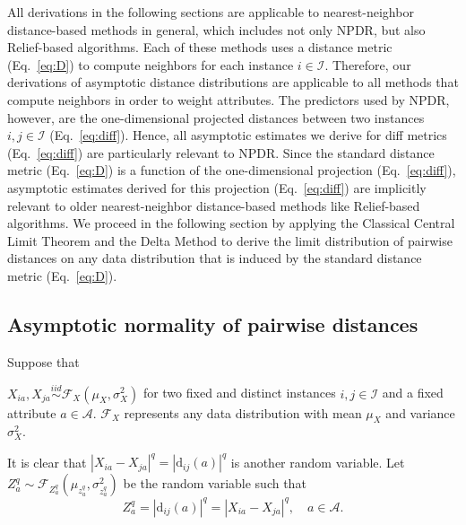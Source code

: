 \documentclass[aos]{imsart}
\begin{document}
All derivations in the following sections are applicable to nearest-neighbor distance-based methods in general, which includes not only NPDR, but also Relief-based algorithms. Each of these methods uses a distance metric (Eq.~\ref{eq:D}) to compute neighbors for each instance $i \in \mathcal{I}$. Therefore, our derivations of asymptotic distance distributions are applicable to all methods that compute neighbors in order to weight attributes. The predictors used by NPDR, however, are the one-dimensional projected distances between two instances $i,j \in \mathcal{I}$ (Eq.~\ref{eq:diff}). Hence, all asymptotic estimates we derive for diff metrics (Eq.~\ref{eq:diff}) are particularly relevant to NPDR. Since the standard distance metric (Eq.~\ref{eq:D}) is a function of the one-dimensional projection (Eq.~\ref{eq:diff}), asymptotic estimates derived for this projection (Eq.~\ref{eq:diff}) are implicitly relevant to older nearest-neighbor distance-based methods like Relief-based algorithms. We proceed in the following section by applying the Classical Central Limit Theorem and the Delta Method to derive the limit distribution of pairwise distances on any data distribution that is induced by the standard distance metric (Eq.~\ref{eq:D}).

\subsection{Asymptotic normality of pairwise distances}

Suppose that 

\noindent $X_{ia}, X_{ja} \overset{iid}{\sim} \mathcal{F}_X\left(\mu_X,\sigma^2_X\right)$ for two fixed and distinct instances $i,j \in \mathcal{I}$ and a fixed attribute $a \in \mathcal{A}$.
$\mathcal{F}_X$ represents any data distribution with mean $\mu_X$ and variance $\sigma^2_X$.

It is clear that $|X_{ia} - X_{ja}|^q = |\text{d}_{ij}(a)|^q$ is another random variable. Let $Z^q_a \sim \mathcal{F}_{Z^q_a}\left(\mu_{z^q_a},\sigma^2_{z^q_a}\right)$ be the random variable such that
%
\begin{equation}\label{eq:diffDistr}
Z^q_a = |\text{d}_{ij}(a)|^q = |X_{ia} - X_{ja}|^q, \quad a \in \mathcal{A}.
\end{equation}
\end{document}
